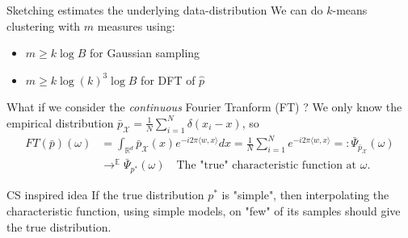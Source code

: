 \begin{frame}{Sketching estimates the underlying data-distribution}
	We can do $k$-means clustering with $m$ measures using:
		\begin{itemize}
			\item $m\geq k\log{B}$ for Gaussian sampling
			\item $m \geq k\log(k)^3\log{B}$ for DFT of $\hat{p}$
		\end{itemize}
	What if we consider the \emph{continuous} Fourier Tranform (FT) ?
	\newline
	We only know the empirical distribution $\bar p_\mathcal{X} = \frac{1}{N}\sum_{i=1}^N \delta(x_i - x)$, so
	\begin{align*}
		FT(\bar p)(\omega) &= \int_{\mathbb{R}^d} \bar p_\mathcal{X}(x) e^{-i2\pi\langle w, x\rangle}dx = \frac{1}{N}\sum_{i=1}^N e^{-i2\pi\langle w,x\rangle} =: \bar \Psi_{\bar p_\mathcal{X}}(\omega) \\
				&\longrightarrow^{\mathbb{E}} \bar \Psi_{p^*}(\omega) \quad\text{The "true" characteristic function at $\omega$}.
	\end{align*}
	\begin{block}{CS inspired idea}
		If the true distribution $p^*$ is "simple", then interpolating the characteristic function, using simple models, on "few" of its samples should give the true distribution.
	\end{block}
\end{frame}

